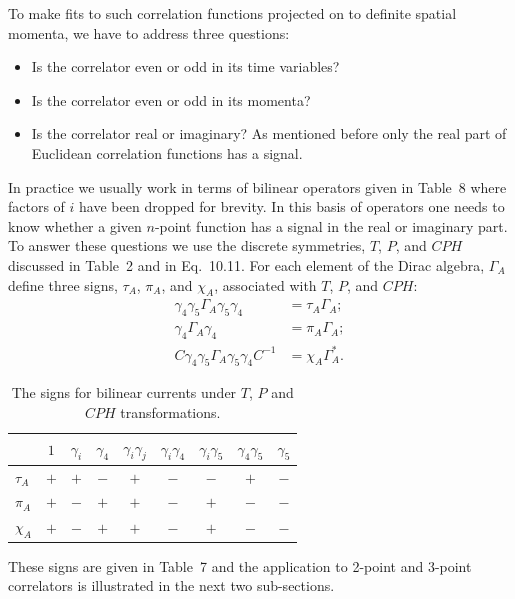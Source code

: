 To make fits to such correlation functions projected on to definite spatial
momenta, we have to address three questions:
\begin{itemize}
\item Is the correlator even or odd in its time variables?
\item Is the correlator even or odd in its momenta?
\item Is the correlator real or imaginary?  As mentioned before only the real
part of Euclidean correlation functions has a signal.
\end{itemize}

In practice we usually work in terms of bilinear operators given in Table~8
where factors of $i$ have been dropped for brevity.  In this basis of operators
one needs to know whether a given $n$-point function has a signal in the real
or imaginary part.  To answer these questions we use the discrete symmetries,
$T$, $P$, and $CPH$ discussed in Table~2 and in Eq.~10.11.  For each element of
the Dirac algebra, $\Gamma_A$ define three signs, $\tau_A$, $\pi_A$, and
$\chi_A$, associated with $T$, $P$, and $CPH$:
\begin{equation}
\begin{aligned}
\gamma_4\gamma_5\Gamma_A\gamma_5\gamma_4 &= \tau_A\Gamma_A;\\
\gamma_4\Gamma_A\gamma_4 &= \pi_A\Gamma_A;\\
C\gamma_4\gamma_5\Gamma_A\gamma_5\gamma_4 C^{-1} &= \chi_A\Gamma_A^* .
\end{aligned}
\end{equation}

\begin{table}[htbp]
\centering
\begin{tabular}{lcccccccc}
\toprule
 & $1$ & $\gamma_i$ & $\gamma_4$ & $\gamma_i\gamma_j$ & $\gamma_i\gamma_4$ & $\gamma_i\gamma_5$ & $\gamma_4\gamma_5$ & $\gamma_5$ \\
\midrule
$\tau_A$ & $+$ & $+$ & $-$ & $+$ & $-$ & $-$ & $+$ & $-$ \\
$\pi_A$ & $+$ & $-$ & $+$ & $+$ & $-$ & $+$ & $-$ & $-$ \\
$\chi_A$ & $+$ & $-$ & $+$ & $+$ & $-$ & $+$ & $-$ & $-$ \\
\bottomrule
\end{tabular}
\caption{The signs for bilinear currents under $T$, $P$ and $CPH$
transformations.}
\label{tab:7}
\end{table}

These signs are given in Table~7 and the application to 2-point and 3-point
correlators is illustrated in the next two sub-sections.

